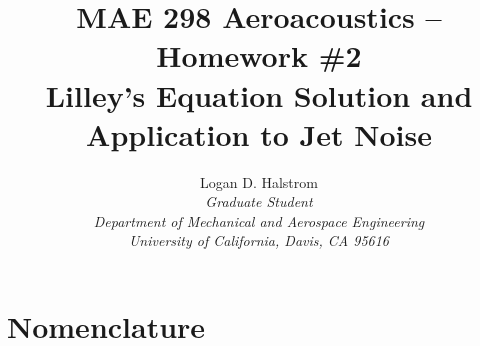 \documentclass[]{aiaa-tc}%
\title{MAE 298 Aeroacoustics -- Homework \#2 \\ Lilley's Equation Solution and Application to Jet Noise}
\author{
  Logan D. Halstrom \\
  {\normalsize\itshape Graduate Student} \\
  {\normalsize\itshape Department of Mechanical and Aerospace Engineering} \\
  {\normalsize\itshape University of California, Davis, CA 95616}
       }
\begin{document}
\maketitle




\section*{Nomenclature}

\begin{multicols}{2}


\end{multicols}
\end{document}
